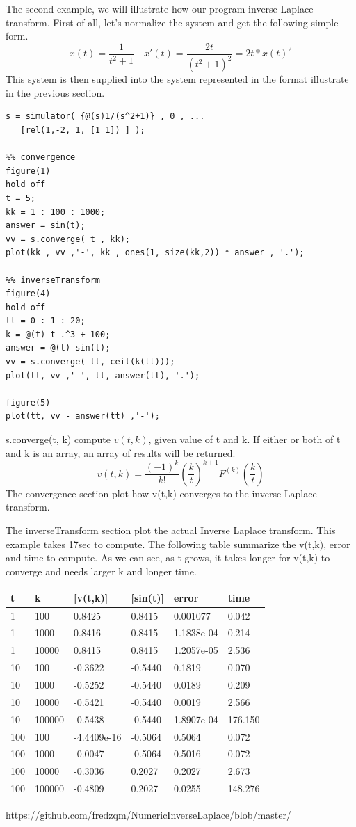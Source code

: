 \documentclass[12pt]{article}
\begin{document}
The second example, we will illustrate how our program inverse Laplace transform. First of all, let's normalize the system and get the following simple form.
\begin{equation}
x(t) = \frac{1}{t^2 + 1} \quad x'(t) = \frac{2t}{(t^2 + 1)^2} = 2t *x(t)^2
\end{equation}
This system is then supplied into the system represented in the format illustrate in the previous section.
\begin{lstlisting}
s = simulator( {@(s)1/(s^2+1)} , 0 , ...
   [rel(1,-2, 1, [1 1]) ] );
   
%% convergence
figure(1)
hold off
t = 5;
kk = 1 : 100 : 1000;
answer = sin(t);
vv = s.converge( t , kk);
plot(kk , vv ,'-', kk , ones(1, size(kk,2)) * answer , '.');

%% inverseTransform
figure(4)
hold off
tt = 0 : 1 : 20;
k = @(t) t .^3 + 100;
answer = @(t) sin(t);
vv = s.converge( tt, ceil(k(tt)));
plot(tt, vv ,'-', tt, answer(tt), '.');

figure(5)
plot(tt, vv - answer(tt) ,'-');
\end{lstlisting}

s.converge(t, k) compute $v(t, k)$, given value of t and k. If either or both of t and k is an array, an array of results will be returned.
\begin{equation*}
v(t, k) = \frac{(-1)^{k}}{k!} \left(\frac{k}{t}\right)^{k+1}  F^{(k)} \left(\frac{k}{t}\right)
\end{equation*}
The convergence section plot how v(t,k) converges to the inverse Laplace transform.

The inverseTransform section plot the actual Inverse Laplace transform. This example takes 17sec to compute.
The following table summarize the v(t,k), error and time to compute. As we can see, as t grows, it takes longer for v(t,k) to converge and needs larger k and longer time.

\begin{tabular}{| l | l | l | l | l | l |}
\hline
t  &  k   &  [v(t,k)] & [sin(t)] & error & time \\
\hline
1  &  100 &  0.8425 & 0.8415 & 0.001077 & 0.042 \\
\hline
1  &  1000 &  0.8416 & 0.8415 & 1.1838e-04 & 0.214 \\
\hline
1  &  10000 &  0.8415 & 0.8415 & 1.2057e-05 & 2.536 \\
\hline
10  &  100 &  -0.3622 & -0.5440 & 0.1819 & 0.070 \\
\hline
10  &  1000 &  -0.5252 & -0.5440 & 0.0189 & 0.209 \\
\hline
10  &  10000 &  -0.5421 & -0.5440 & 0.0019 & 2.566 \\
\hline
10  &  100000 &  -0.5438 & -0.5440 & 1.8907e-04 & 176.150\\
\hline
100  &  100 &  -4.4409e-16 & -0.5064 & 0.5064 & 0.072 \\
\hline
100  &  1000 &  -0.0047 & -0.5064 & 0.5016 & 0.072 \\
\hline
100  &  10000 &  -0.3036 & 0.2027 & 0.2027 & 2.673 \\
\hline
100  &  100000 &  -0.4809 & 0.2027 & 0.0255 & 148.276  \\
\hline
\end{tabular}

https://github.com/fredzqm/NumericInverseLaplace/blob/master/

\clearpage

\end{document}
